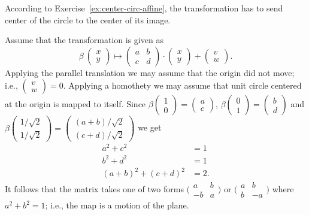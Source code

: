 According to Exercise~\ref{ex:center-circ-affine}, the transformation has to send center of the circle to the center of its image.

Assume that the transformation is given as
\[\beta\:\left(\begin{smallmatrix}
x\\ y
\end{smallmatrix} \right)
  \mapsto
  \left(\begin{smallmatrix}
a&b\\ c&d
\end{smallmatrix} \right)
  \cdot
  \left(\begin{smallmatrix}
x\\ y
\end{smallmatrix} \right)
  +
\left(\begin{smallmatrix}
v\\ w
\end{smallmatrix} \right).
\]
Applying the parallel translation we may assume that the origin did not move; i.e., $\left(\begin{smallmatrix}
v\\ w
\end{smallmatrix} \right)=0$.
Applying a homothety we may assume that unit circle centered at the origin is mapped to itself.
Since $\beta\left(\begin{smallmatrix}
1\\ 0
\end{smallmatrix} \right)
=
\left(\begin{smallmatrix}
a\\c 
\end{smallmatrix} \right)$,
$\beta\left(\begin{smallmatrix}
0\\ 1
\end{smallmatrix} \right)
=
\left(\begin{smallmatrix}
b\\d 
\end{smallmatrix} \right)$ 
and 
$\beta\left(\begin{smallmatrix}
1/\sqrt{2}\\ 1/\sqrt{2}
\end{smallmatrix} \right)
=
\left(\begin{smallmatrix}
(a+b)/\sqrt{2}\\(c+d)/\sqrt{2} 
\end{smallmatrix} \right)$
we get
\begin{align*}
a^2+c^2&=1\\
b^2+d^2&=1\\
(a+b)^2+(c+d)^2&=2.
\end{align*}
It follows that the matrix takes one of two forms $\bigl(\begin{smallmatrix}
a&b\\ -b&a
\end{smallmatrix} \bigr)$
or 
$\bigl(\begin{smallmatrix}
a&b\\ b&-a
\end{smallmatrix} \bigr)$ where $a^2+b^2=1$;
i.e., the map is a motion of the plane.




